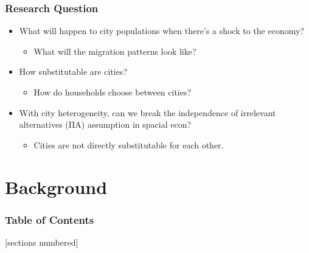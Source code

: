\documentclass[serif, 9pt, aspectratio=32]{beamer}
\begin{document}
\begin{frame}
    \centering
    \frametitle{Research Question}
    \begin{itemize}
        \setlength{\itemsep}{3em}
        \item What will happen to city populations when there's a shock to the economy?
              \begin{itemize}
                  \item What will the migration patterns look like?
              \end{itemize}
        \item How substitutable are cities?
              \begin{itemize}
                  \item How do households choose between cities?
              \end{itemize}
        \item With city heterogeneity, can we break the independence of irrelevant alternatives (IIA) assumption in spacial econ?
              \begin{itemize}
                  \item Cities are not directly substitutable for each other.
              \end{itemize}
    \end{itemize}
\end{frame}

\section{Background}

\begin{frame}
    \frametitle{Table of Contents}
    [sections numbered]
    \tableofcontents[currentsection]
\end{frame}
\end{document}
